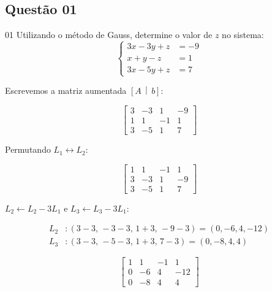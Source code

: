 \subsection*{Questão 01}

\newcommand{\fourthirds}{\frac{4}{3}}

\begin{questionbox}{01}
  Utilizando o método de Gauss, determine o valor de $z$ no sistema:
  \[
  \left\{
  \begin{aligned}
  3x - 3y + z &= -9 \\
  x + y - z &= 1 \\
  3x - 5y + z &= 7
  \end{aligned}
  \right.
  \]
\end{questionbox}

\begin{solutionbox}
  Escrevemos a matriz aumentada $\left[ A \,\middle|\, b \right]$:

  \[
  \left[
  \begin{array}{ccc|c}
  3 & -3 & 1 & -9 \\
  1 & 1 & -1 & 1 \\
  3 & -5 & 1 & 7
  \end{array}
  \right]
  \]

  Permutando $L_{1} \leftrightarrow L_{2}$:

  \[
  \left[
  \begin{array}{ccc|c}
  1 & 1 & -1 & 1 \\
  3 & -3 & 1 & -9 \\
  3 & -5 & 1 & 7
  \end{array}
  \right]
  \]

  \end{solutionbox}

  \begin{solutionbox}

  $L_{2} \leftarrow L_{2} - 3L_{1}$ e $L_{3} \leftarrow L_{3} - 3L_{1}$:

  \[
  \begin{aligned}
  L_{2} &: (3-3,\,-3-3,\,1+3,\,-9-3) = (0,-6,4,-12) \\
  L_{3} &: (3-3,\,-5-3,\,1+3,\,7-3) = (0,-8,4,4)
  \end{aligned}
  \]

  \[
  \left[
  \begin{array}{ccc|c}
  1 & 1 & -1 & 1 \\
  0 & -6 & 4 & -12 \\
  0 & -8 & 4 & 4
  \end{array}
  \right]
  \]
\end{solutionbox}

